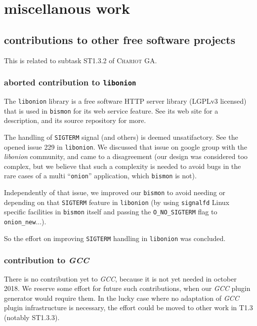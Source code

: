\section{miscellanous work}
\label{sec:miscwork}

\subsection{contributions to other free software projects}

\label{subsec:contribfree}
This is related to subtask ST1.3.2 of \textsc{Chariot} GA.

\subsubsection{aborted contribution to \texttt{libonion}}
\label{subsubsec:contriblibonion}
The \texttt{libonion} library is a free software HTTP server library
(LGPLv3 licensed) that is used in \texttt{bismon} for its web service
feature. See its web site 
for a description, and its source repository
 for more.

The handling of \texttt{SIGTERM} signal (and others) is deemed
unsatifactory. See the opened issue 229 {} in
\texttt{libonion}.  We discussed that issue on google group with the
\emph{libonion} community, and came to a disagreement (our design was
considered too complex, but we believe that such a complexity is
needed to avoid bugs in the rare cases of a multi ``\texttt{onion}''
application, which \texttt{bismon} is not).

Independently of that issue, we improved our \texttt{bismon} to avoid
needing or depending on that \texttt{SIGTERM} feature in
\texttt{libonion} (by using \texttt{signalfd} Linux specific
facilities in \texttt{bismon} itself and passing the
\texttt{O\_NO\_SIGTERM} flag to \texttt{onion\_new}...).

So the effort on improving \texttt{SIGTERM} handling in
\texttt{libonion} was concluded.

\subsubsection{contribution to \emph{GCC}}
\label{subsubsec:contribgcc}
There is no contribution yet to \emph{GCC}, because it is not yet
needed in october 2018. We reserve some effort for future such
contributions, when our \emph{GCC} plugin generator would require
them. In the lucky case where no adaptation of \emph{GCC} plugin
infrastructure is necessary, the effort could be moved to other work
in T1.3 (notably ST1.3.3).

